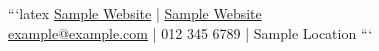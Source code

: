 ```latex
{
  \href{https://www.example.com}{Sample Website} | \href{https://www.example.com}{Sample Website}\\
  \href{mailto:example@example.com}{example@example.com} | 012 345 6789 | Sample Location
}
```